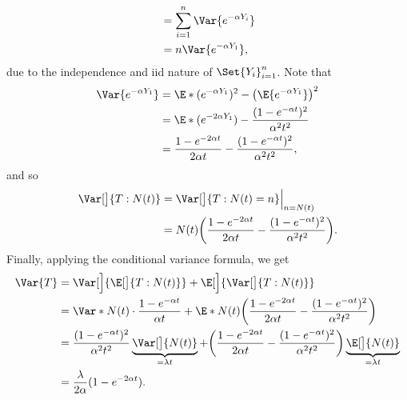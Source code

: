 \begin{Example}
\begin{align*}
         & =\sum_{i=1}^{n}\Var{e^{-\alpha Y_i}}                                                                                     \\
         & =n\Var{e^{-\alpha Y_1}},
    \end{align*}
    due to the independence and iid nature of $ \Set{Y_i}_{i=1}^n $. Note that
    \begin{align*}
        \Var{e^{-\alpha Y_1}}
         & =\E*{(e^{-\alpha Y_1})^2}-\bigl(\E{e^{-\alpha Y_1}}\bigr)^2                  \\
         & =\E*{(e^{-2\alpha Y_1})}-\frac{(1-e^{-\alpha t})^2}{\alpha^2t^2}             \\
         & =\frac{1-e^{-2\alpha t}}{2\alpha t}-\frac{(1-e^{-\alpha t})^2}{\alpha^2t^2},
    \end{align*}
    and so
    \begin{align*}
        \Var[\big]{T\given N(t)}
         & =\Var[\big]{T\given N(t)=n}\Big\vert_{n=N(t)}                                                  \\
         & =N(t)\biggl(\frac{1-e^{-2\alpha t}}{2\alpha t}-\frac{(1-e^{-\alpha t})^2}{\alpha^2t^2}\biggr).
    \end{align*}
    Finally, applying the conditional variance formula, we get
    \begin{align*}
        \Var{T}
         & =\Var[\Big]{\E[\big]{T\given N(t)}}
        +\E[\Big]{\Var[\big]{T\given N(t)}}                                                                                               \\
         & =\Var*{N(t)\cdot \frac{1-e^{-\alpha t}}{\alpha t}}+
        \E*{N(t)\biggl(\frac{1-e^{-2\alpha t}}{2\alpha t}-\frac{(1-e^{-\alpha t})^2}{\alpha^2t^2}\biggr)}                                 \\
         & =\frac{(1-e^{-\alpha t})^2}{\alpha^2t^2}\underbrace{\Var[\big]{N(t)}}_{=\lambda t}
        +\biggl(\frac{1-e^{-2\alpha t}}{2\alpha t}-\frac{(1-e^{-\alpha t})^2}{\alpha^2t^2}\biggr)\underbrace{\E[\big]{N(t)}}_{=\lambda t} \\
         & =\frac{\lambda}{2\alpha}(1-e^{-2\alpha t}).
    \end{align*}
\end{Example}
